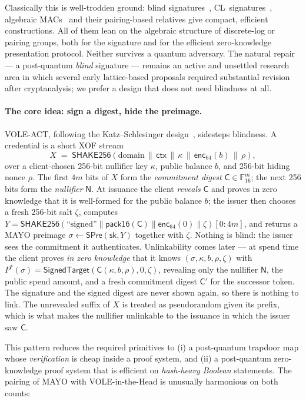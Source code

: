 \documentclass[11pt]{article}
\newcommand{\F}{\mathbb{F}}
\newcommand{\Fsixteen}{\F_{16}}
\newcommand{\shake}{\mathsf{SHAKE256}}
\newcommand{\ctx}{\mathsf{ctx}}
\newcommand{\Spre}{\mathsf{SPre}}
\newcommand{\enc}{\mathsf{enc}_{64}}
\newcommand{\Cred}{\mathsf{C}}
\newcommand{\Null}{\mathsf{N}}
\begin{document}
Classically this is well-trodden ground: blind signatures~\cite{Chaum82},
CL~signatures~\cite{CL01}, algebraic MACs~\cite{CMZ14} and their pairing-based
relatives give compact, efficient constructions. All of them lean on the
algebraic structure of discrete-log or pairing groups, both for the signature
and for the efficient zero-knowledge presentation protocol. Neither survives
a quantum adversary. The natural repair --- a post-quantum \emph{blind}
signature --- remains an active and unsettled research area in which several
early lattice-based proposals required substantial revision after
cryptanalysis; we prefer a design that does not need blindness at all.

\paragraph{The core idea: sign a digest, hide the preimage.}
VOLE-ACT, following the Katz--Schlesinger design~\cite{KS}, sidesteps
blindness. A credential is a short XOF stream
\[
X \;=\; \shake(\text{domain} \,\|\, \ctx \,\|\, \kappa \,\|\, \enc(b) \,\|\, \rho),
\]
over a client-chosen 256-bit nullifier key $\kappa$, public balance $b$, and
256-bit hiding nonce $\rho$. The first $4m$ bits of $X$ form the
\emph{commitment digest} $\Cred \in \Fsixteen^m$; the next 256 bits form the
\emph{nullifier} $\Null$. At issuance the client \emph{reveals} $\Cred$ and
proves in zero knowledge that it is well-formed for the public balance $b$;
the issuer then chooses a fresh 256-bit salt $\zeta$, computes
$Y=\shake(\text{``signed''}\|\mathsf{pack16}(\Cred)\|\enc(0)\|\zeta)[0{:}4m]$,
and returns a MAYO preimage $\sigma \gets \Spre(\mathsf{sk},Y)$ together
with $\zeta$. Nothing is blind: the issuer sees the commitment it
authenticates. Unlinkability comes later --- at
spend time the client proves \emph{in zero knowledge} that it knows
$(\sigma, \kappa, b, \rho,\zeta)$ with
$P^\ast(\sigma)=\mathsf{SignedTarget}(\Cred(\kappa,b,\rho),0,\zeta)$,
revealing only the nullifier $\Null$, the public spend amount, and a fresh
commitment digest $\Cred'$ for the successor token. The signature and the
signed digest are never shown again, so there is nothing to link. The
unrevealed suffix of $X$ is treated as pseudorandom given its prefix, which
is what makes the nullifier unlinkable to the issuance in which the issuer
saw $\Cred$.

This pattern reduces the required primitives to (i) a post-quantum trapdoor
map whose \emph{verification} is cheap inside a proof system, and (ii) a
post-quantum zero-knowledge proof system that is efficient on
\emph{hash-heavy Boolean} statements. The pairing of MAYO with
VOLE-in-the-Head is unusually harmonious on both counts:
\end{document}
